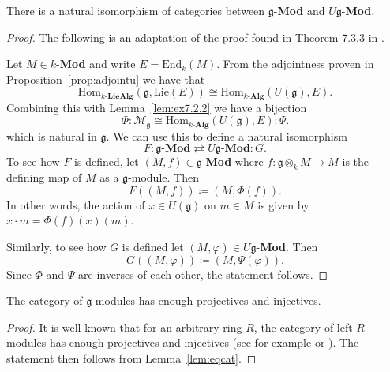 \begin{proposition}
  \label{prop:gmodeq}
  There is a natural isomorphism of categories between $ \mathfrak{g} $-\textbf{Mod} and $ U\mathfrak{g} $-\textbf{Mod}.
\end{proposition}
\begin{proof}
  The following is an adaptation of the proof found in Theorem 7.3.3 in \cite{weibel1994homological}.

  Let $ M \in k $-\textbf{Mod} and write $ E = \text{End}_k(M) $. From the adjointness proven in Proposition~\ref{prop:adjointu} we have that
  \begin{equation}
    \text{Hom}_{k\text{-}\mathbf{LieAlg}}(\mathfrak{g}, \text{Lie}(E)) \cong \text{Hom}_{k\text{-}\mathbf{Alg}}(U(\mathfrak{g}), E).
    \label{eq:adjointu}
  \end{equation}
  Combining this with Lemma~\ref{lem:ex7.2.2} we have a bijection
  \begin{equation}
    \Phi:\mathcal{M}_{\mathfrak{g}} \cong \text{Hom}_{k\text{-}\mathbf{Alg}}(U(\mathfrak{g}), E):\Psi.
  \end{equation}
  which is natural in $ \mathfrak{g} $.
  We can use this to define a natural isomorphism
  \begin{equation}
    F:\mathfrak{g}\text{-}\mathbf{Mod} \rightleftarrows U\mathfrak{g}\text{-}\mathbf{Mod}:G.
  \end{equation}
  To see how $ F $ is defined, let $ (M, f) \in \mathfrak{g} $-\textbf{Mod} where $ f: \mathfrak{g} \otimes_k M \to M $ is the defining map of $ M $ as a $ \mathfrak{g} $-module. Then
  \begin{equation}
    F((M, f))\coloneqq (M, \Phi(f))
  .\end{equation}
  In other words, the action of $ x \in U(\mathfrak{g}) $ on $ m \in M $ is given by $ x\cdot m = \Phi(f)(x)(m) $.

  Similarly, to see how $ G $ is defined let $ (M, \varphi) \in U\mathfrak{g} $-\textbf{Mod}. Then
  \begin{equation}
    G((M, \varphi)) \coloneqq (M, \Psi(\varphi)).
  \end{equation}
  Since $ \Phi $ and $ \Psi $ are inverses of each other, the statement follows.
\end{proof}

\begin{corollary}
  \label{cor:projinj}
  The category of $ \mathfrak{g} $-modules has enough projectives and injectives.
\end{corollary}
\begin{proof}
  It is well known that for an arbitrary ring $ R $, the category of left $ R $-modules has enough projectives and injectives (see for example \cite{Monnet2021} or \cite{weibel1994homological}). The statement then follows from Lemma~\ref{lem:eqcat}.
\end{proof}
